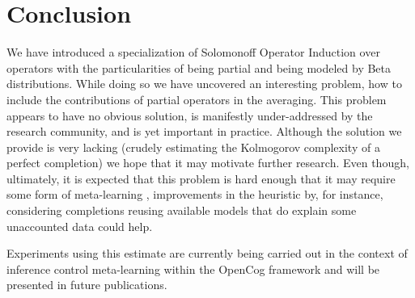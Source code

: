 \documentclass[runningheads]{llncs}
\begin{document}
\section{Conclusion}
\label{con}
We have introduced a specialization of Solomonoff Operator Induction
over operators with the particularities of being partial and being
modeled by Beta distributions. While doing so we have uncovered an
interesting problem, how to include the contributions of partial
operators in the averaging. This problem appears to have no obvious
solution, is manifestly under-addressed by the research community, and
is yet important in practice. Although the solution we provide is very
lacking (crudely estimating the Kolmogorov complexity of a perfect
completion) we hope that it may motivate further research.
Even though, ultimately, it is expected that this problem is hard
enough that it may require some form of meta-learning
\cite{Goertzel16Probabilistic}, improvements in the heuristic by, for
instance, considering completions reusing available models that do
explain some unaccounted data could help.

Experiments using this estimate are currently being carried out in the
context of inference control meta-learning within the OpenCog
framework and will be presented in future publications.

%
%


\end{document}
